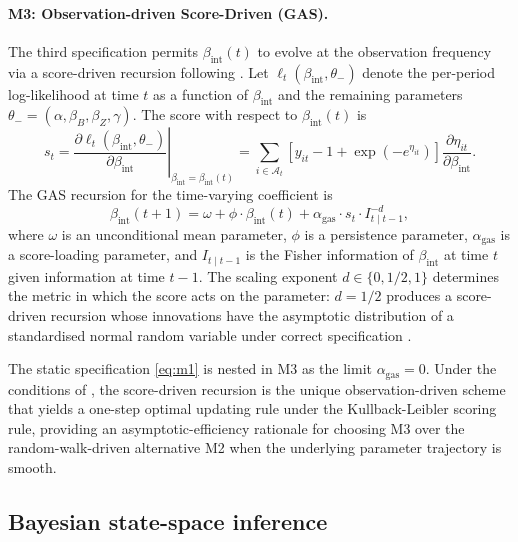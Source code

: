 \documentclass[12pt,a4paper]{article}
\newcommand{\bint}{\beta_{\text{int}}}
\theoremstyle{plain}
\theoremstyle{definition}
\begin{document}
\paragraph{M3: Observation-driven Score-Driven (GAS).}
The third specification permits $\bint(t)$ to evolve at the observation frequency via a score-driven recursion following \cite{creal2013generalized}. Let $\ell_t(\bint, \theta_{-})$ denote the per-period log-likelihood at time $t$ as a function of $\bint$ and the remaining parameters $\theta_{-} = (\alpha, \beta_B, \beta_Z, \gamma)$. The score with respect to $\bint(t)$ is
\begin{equation}
s_t = \left.\frac{\partial \ell_t(\bint, \theta_{-})}{\partial \bint}\right|_{\bint = \bint(t)} = \sum_{i \in \mathcal{A}_t} \left[y_{it} - 1 + \exp(-e^{\eta_{it}})\right] \frac{\partial \eta_{it}}{\partial \bint}.
\label{eq:score}
\end{equation}
The GAS recursion for the time-varying coefficient is
\begin{equation}
\bint(t+1) = \omega + \phi \cdot \bint(t) + \alpha_{\mathrm{gas}} \cdot s_t \cdot I_{t \mid t-1}^{-d},
\label{eq:gas}
\end{equation}
where $\omega$ is an unconditional mean parameter, $\phi$ is a persistence parameter, $\alpha_{\mathrm{gas}}$ is a score-loading parameter, and $I_{t \mid t-1}$ is the Fisher information of $\bint$ at time $t$ given information at time $t-1$. The scaling exponent $d \in \{0, 1/2, 1\}$ determines the metric in which the score acts on the parameter: $d = 1/2$ produces a score-driven recursion whose innovations have the asymptotic distribution of a standardised normal random variable under correct specification \citep{harvey2013dynamic}.

The static specification \eqref{eq:m1} is nested in M3 as the limit $\alpha_{\mathrm{gas}} = 0$. Under the conditions of \cite{blasques2015robust}, the score-driven recursion is the unique observation-driven scheme that yields a one-step optimal updating rule under the Kullback-Leibler scoring rule, providing an asymptotic-efficiency rationale for choosing M3 over the random-walk-driven alternative M2 when the underlying parameter trajectory is smooth.

\subsection{Bayesian state-space inference}
\label{sec:meth-bayes}
\end{document}
